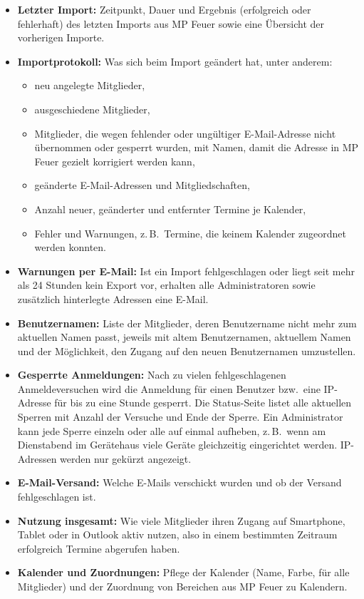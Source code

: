 \documentclass[a4paper,fontsize=10pt]{scrartcl}
\begin{document}
\begin{itemize}
  \item \textbf{Letzter Import:} Zeitpunkt, Dauer und Ergebnis
        (erfolgreich oder fehlerhaft) des letzten Imports aus MP Feuer sowie
        eine Übersicht der vorherigen Importe.
  \item \textbf{Importprotokoll:} Was sich beim Import geändert hat, unter
        anderem:
        \begin{itemize}
          \item neu angelegte Mitglieder,
          \item ausgeschiedene Mitglieder,
          \item Mitglieder, die wegen fehlender oder ungültiger E-Mail-Adresse
                nicht übernommen oder gesperrt wurden, mit Namen, damit die
                Adresse in MP Feuer gezielt korrigiert werden kann,
          \item geänderte E-Mail-Adressen und Mitgliedschaften,
          \item Anzahl neuer, geänderter und entfernter Termine je Kalender,
          \item Fehler und Warnungen, z.\,B.\ Termine, die keinem Kalender
                zugeordnet werden konnten.
        \end{itemize}
  \item \textbf{Warnungen per E-Mail:} Ist ein Import fehlgeschlagen oder
        liegt seit mehr als 24 Stunden kein Export vor, erhalten alle
        Administratoren sowie zusätzlich hinterlegte Adressen eine E-Mail.
  \item \textbf{Benutzernamen:} Liste der Mitglieder, deren Benutzername
        nicht mehr zum aktuellen Namen passt, jeweils mit altem
        Benutzernamen, aktuellem Namen und der Möglichkeit, den Zugang auf
        den neuen Benutzernamen umzustellen.
  \item \textbf{Gesperrte Anmeldungen:} Nach zu vielen fehlgeschlagenen
        Anmeldeversuchen wird die Anmeldung für einen Benutzer bzw.\ eine
        IP-Adresse für bis zu eine Stunde gesperrt. Die Status-Seite listet
        alle aktuellen Sperren mit Anzahl der Versuche und Ende der Sperre.
        Ein Administrator kann jede Sperre einzeln oder alle auf einmal
        aufheben, z.\,B.\ wenn am Dienstabend im Gerätehaus viele Geräte
        gleichzeitig eingerichtet werden. IP-Adressen werden nur gekürzt
        angezeigt.
  \item \textbf{E-Mail-Versand:} Welche E-Mails verschickt wurden und ob der
        Versand fehlgeschlagen ist.
  \item \textbf{Nutzung insgesamt:} Wie viele Mitglieder ihren Zugang auf
        Smartphone, Tablet oder in Outlook aktiv nutzen, also in einem
        bestimmten Zeitraum erfolgreich Termine abgerufen haben.
  \item \textbf{Kalender und Zuordnungen:} Pflege der Kalender (Name, Farbe,
        \glqq für alle Mitglieder\grqq) und der Zuordnung von Bereichen aus
        MP Feuer zu Kalendern.
\end{itemize}
\end{document}
